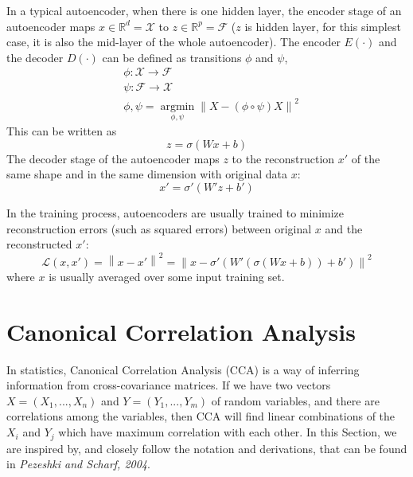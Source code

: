 \documentclass[12pt]{report} %
\newcommand{\norm}[1]{\left\lVert #1 \right\rVert}
\begin{document}
In a typical autoencoder, when there is one hidden layer, the encoder stage of an autoencoder maps \(x\in \mathbb{R}^{d}=\mathcal{X}\) to \(z\in \mathbb{R}^{p}=\mathcal{F}\) ($z$ is hidden layer, for this simplest case, it is also the mid-layer of the whole autoencoder). The encoder \(E(\cdot)\) and the decoder \(D(\cdot)\) can be defined as transitions $\phi$ and $\psi$,
\begin{equation}
\begin{split}
& \phi:\mathcal{X}\to\mathcal{F} \\
& \psi:\mathcal{F}\to\mathcal{X} \\
& \phi,\psi=\operatorname*{argmin}_{\phi,\psi} \norm{X-(\phi \circ \psi)X}^2
\end{split}
\end{equation}
This can be written as
\begin{equation}
z=\sigma(Wx+b)
\end{equation}
The decoder stage of the autoencoder maps $z$ to the reconstruction $x'$  of the same shape and in the same dimension with original data $x$:
\begin{equation}
x'=\sigma'(W'z+b')
\end{equation}

In the training process, autoencoders are usually trained to minimize reconstruction errors (such as squared errors) between original $x$ and the reconstructed $x'$:
\begin{equation}
\mathcal{L}(x,x')=\norm{x-x'}^2=\norm{x-\sigma'(W'(\sigma(Wx+b))+b')}^2
\end{equation}
where $x$ is usually averaged over some input training set\cite{AE}.

\section{Canonical Correlation Analysis}
In statistics, Canonical Correlation Analysis (CCA) is a way of inferring information from cross-covariance matrices. If we have two vectors \(X = (X_{1}, ..., X_{n})\) and \(Y = (Y_{1}, ..., Y_{m})\) of random variables, and there are correlations among the variables, then CCA will find linear combinations of the $X_{i}$ and $Y_{j}$ which have maximum correlation with each other\cite{CCA}. In this Section, we are inspired by, and closely follow the notation and derivations, that can be found in \textit{Pezeshki and Scharf, 2004}\cite{ECCA}.
\end{document}
